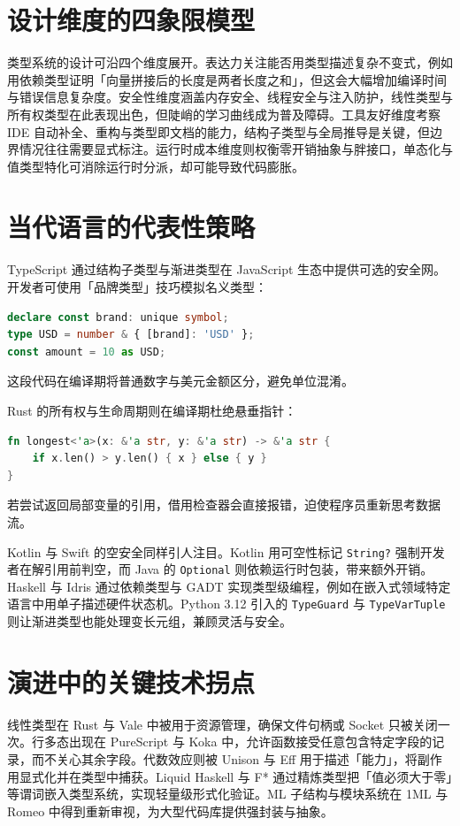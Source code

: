\chapter{设计维度的四象限模型}
类型系统的设计可沿四个维度展开。表达力关注能否用类型描述复杂不变式，例如用依赖类型证明「向量拼接后的长度是两者长度之和」，但这会大幅增加编译时间与错误信息复杂度。安全性维度涵盖内存安全、线程安全与注入防护，线性类型与所有权类型在此表现出色，但陡峭的学习曲线成为普及障碍。工具友好维度考察 IDE 自动补全、重构与类型即文档的能力，结构子类型与全局推导是关键，但边界情况往往需要显式标注。运行时成本维度则权衡零开销抽象与胖接口，单态化与值类型特化可消除运行时分派，却可能导致代码膨胀。\par
\chapter{当代语言的代表性策略}
TypeScript 通过结构子类型与渐进类型在 JavaScript 生态中提供可选的安全网。开发者可使用「品牌类型」技巧模拟名义类型：\par
\begin{lstlisting}[language=ts]
declare const brand: unique symbol;
type USD = number & { [brand]: 'USD' };
const amount = 10 as USD;
\end{lstlisting}
这段代码在编译期将普通数字与美元金额区分，避免单位混淆。\par
Rust 的所有权与生命周期则在编译期杜绝悬垂指针：\par
\begin{lstlisting}[language=rust]
fn longest<'a>(x: &'a str, y: &'a str) -> &'a str {
    if x.len() > y.len() { x } else { y }
}
\end{lstlisting}
若尝试返回局部变量的引用，借用检查器会直接报错，迫使程序员重新思考数据流。\par
Kotlin 与 Swift 的空安全同样引人注目。Kotlin 用可空性标记 \texttt{String?} 强制开发者在解引用前判空，而 Java 的 \texttt{Optional} 则依赖运行时包装，带来额外开销。Haskell 与 Idris 通过依赖类型与 GADT 实现类型级编程，例如在嵌入式领域特定语言中用单子描述硬件状态机。Python 3.12 引入的 \texttt{TypeGuard} 与 \texttt{TypeVarTuple} 则让渐进类型也能处理变长元组，兼顾灵活与安全。\par
\chapter{演进中的关键技术拐点}
线性类型在 Rust 与 Vale 中被用于资源管理，确保文件句柄或 Socket 只被关闭一次。行多态出现在 PureScript 与 Koka 中，允许函数接受任意包含特定字段的记录，而不关心其余字段。代数效应则被 Unison 与 Eff 用于描述「能力」，将副作用显式化并在类型中捕获。Liquid Haskell 与 F* 通过精炼类型把「值必须大于零」等谓词嵌入类型系统，实现轻量级形式化验证。ML 子结构与模块系统在 1ML 与 Romeo 中得到重新审视，为大型代码库提供强封装与抽象。\par
